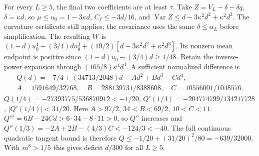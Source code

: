 For every $L\ge5$, the final two coefficients are at least $\tau$.
Take $Z=V_L-\delta-\delta q$, $\delta=\kappa d$, so
$\mu\le u_0=1-3\kappa d$,
$C_f\le-3d/16$, and
$\operatorname{Var}Z\le d-3\kappa^2d^2+\kappa^2d^3$.
The curvature certificate still applies; the covariance uses the same
$\delta\le\alpha_L$ before simplification.
The resulting $W$ is
$(1-d)u_0^4-(3/4)du_0^3+(19/2)[d-3\kappa^2d^2+\kappa^2d^3]$.
Its nonzero mean endpoint is positive since
$(1-d)u_0-(3/4)d\ge1/48$.
Retain the inverse-power expansion through
$(165/8)\kappa^4d^4$. A sufficient normalized difference is
\[
\begin{gathered}
Q(d)=-7/4+(34713/2048)d-Ad^2+Bd^3-Cd^4,\\
A=1591649/32768,\quad B=288139731/8388608,\quad C=10556001/1048576.
\end{gathered}
\]
$Q(1/4)=-27393775/536870912<-1/20$,
$Q'(1/4)=-204774799/134217728$, $|Q'(1/4)|<31/20$.
Here $A>97/2$, $34<B<69/2$, $10<C<11$.
$Q'''=6B-24Cd>6\cdot34-8\cdot11>0$, so $Q''$ increases and
$Q''(1/3)=-2A+2B-(4/3)C<-124/3<-40$.
The full continuous quadratic tangent bound is therefore
$Q\le-1/20+(31/20)^2/80=-639/32000$.
With $m^8>1/5$ this gives deficit $d/300$ for all $L\ge5$.

